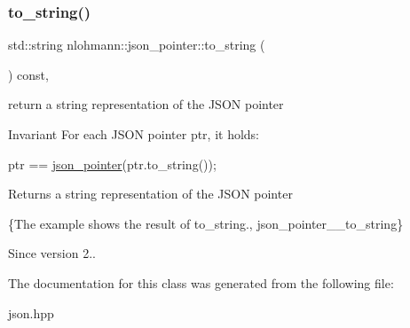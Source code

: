 \subsubsection{\texorpdfstring{to\+\_\+string()}{to\_string()}}
{\footnotesize\ttfamily std\+::string nlohmann\+::json\+\_\+pointer\+::to\+\_\+string (\begin{DoxyParamCaption}{ }\end{DoxyParamCaption}) const\hspace{0.3cm}{\ttfamily [inline]}, {\ttfamily [noexcept]}}



return a string representation of the J\+S\+ON pointer 

\begin{DoxyInvariant}{Invariant}
For each J\+S\+ON pointer {\ttfamily ptr}, it holds\+: 
\begin{DoxyCode}
ptr == \hyperlink{classnlohmann_1_1json__pointer_a203910314c0be11c6b2b2cb53a9ad3aa}{json\_pointer}(ptr.to\_string());
\end{DoxyCode}

\end{DoxyInvariant}
\begin{DoxyReturn}{Returns}
a string representation of the J\+S\+ON pointer
\end{DoxyReturn}
\{The example shows the result of {\ttfamily to\+\_\+string}., json\+\_\+pointer\+\_\+\+\_\+to\+\_\+string\}

\begin{DoxySince}{Since}
version 2.. 
\end{DoxySince}


The documentation for this class was generated from the following file\+:\begin{DoxyCompactItemize}
\item 
json.\+hpp\end{DoxyCompactItemize}
